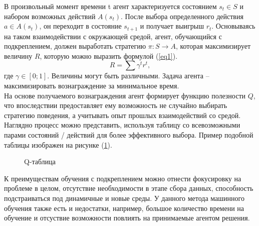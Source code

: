 \documentclass[12 pt, a4paper]{article}
\theoremstyle{definition}
\theoremstyle{plain}
\theoremstyle{remark}
\begin{document}
В произвольный момент времени t агент характеризуется состоянием $s_t \in S$ и набором возможных действий 
$A(s_t)$. После выбора определенного действия $a \in A(s_t)$, он переходит в состояние $s_{t+1}$ и получает выигрыш $r_t$. Основываясь на таком взаимодействии с окружающей средой, агент, обучающийся с подкреплением, должен выработать стратегию $\pi: S \to A$, которая максимизирует величину $R$, которую можно выразить формулой (\ref{eq1}).
\begin{equation}\label{eq1}
R = \sum \gamma^t r^t,
\end{equation}
где $\gamma \in [0;1]$. Величины могут быть различными.
Задача агента --  максимизировать вознаграждение за минимальное время.\\
На основе получаемого вознаграждения агент формирует функцию полезности $Q$, что впоследствии предоставляет ему возможность не случайно выбирать стратегию поведения, а учитывать опыт прошлых взаимодействий со средой. Наглядно процесс можно представить, используя таблицу со всевозможными парами состояний / действий для более эффективного выбора. Пример подобной таблицы изображен на рисунке (\ref{ris:3}).\cite{litlink1}
\begin{figure}[h]
	           \caption{Q-таблица}
		
\label{ris:3}
\end{figure}
К преимуществам обучения с подкреплением можно отнести фокусировку на проблеме в целом, отсутствие необходимости  в этапе сбора данных, способность подстраиваться под динамичные и новые среды. У данного метода машинного обучения также есть и недостатки, например, большое количество времени на обучение и отсуствие возможности повлиять на принимаемые агентом решения.
\\\\\\
\end{document}
